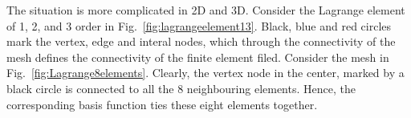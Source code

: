 The situation is more complicated in 2D and 3D. Consider the Lagrange element of 1, 2, and 3 order in Fig.~\ref{fig:lagrangeelement13}. Black, blue and red circles mark
the vertex, edge and interal nodes, which through the connectivity of the mesh defines the connectivity of the finite element filed. 
Consider the mesh in Fig.~\ref{fig:Lagrange8elements}. Clearly, the vertex node in the center, marked by a black circle is connected to all the 8 neighbouring elements. 
Hence, the corresponding basis function ties these eight elements together. 


\begin{figure}
\end{figure}
